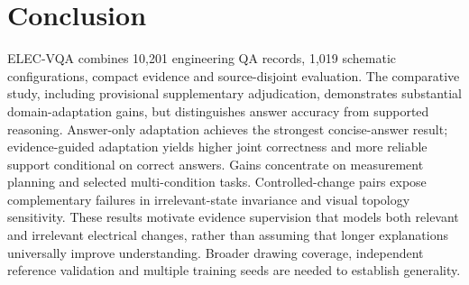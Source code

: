 \section{Conclusion}\label{sec:conclusion}
ELEC-VQA combines 10,201 engineering QA records, 1,019 schematic configurations, compact evidence and source-disjoint evaluation. The comparative study, including provisional supplementary adjudication, demonstrates substantial domain-adaptation gains, but distinguishes answer accuracy from supported reasoning. Answer-only adaptation achieves the strongest concise-answer result; evidence-guided adaptation yields higher joint correctness and more reliable support conditional on correct answers. Gains concentrate on measurement planning and selected multi-condition tasks. Controlled-change pairs expose complementary failures in irrelevant-state invariance and visual topology sensitivity. These results motivate evidence supervision that models both relevant and irrelevant electrical changes, rather than assuming that longer explanations universally improve understanding. Broader drawing coverage, independent reference validation and multiple training seeds are needed to establish generality.
